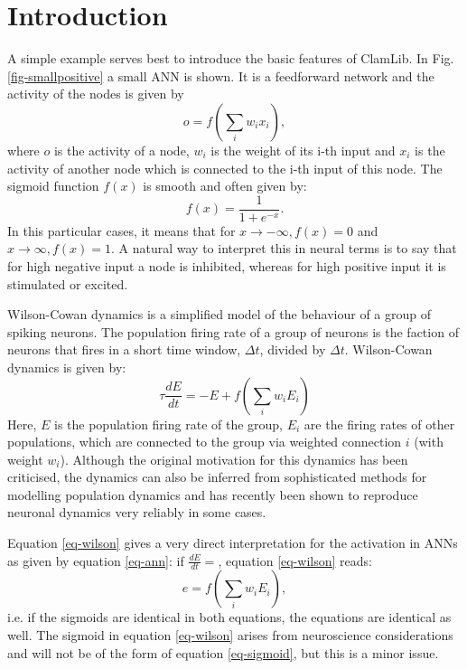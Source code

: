 \documentclass[11pt]{article}
\begin{document}
\section{Introduction}
A simple example serves best to introduce the basic features of ClamLib.
In Fig. \ref{fig-smallpositive} a small ANN is shown. It is a feedforward network and the activity of the nodes is given by
\begin{equation}
 o = f( \sum_i w_ix_i),
\label{eq-ann}
\end{equation}
where $o$ is the activity of a node, $w_i$ is the weight of its i-th input and $x_i$ is the activity of another node which is connected to the i-th input of this node.
The sigmoid function $f(x)$ is smooth and often given by:
\begin{equation}
f(x) = \frac{1}{1+ e^{-x}}.
\label{eq-sigmoid}
\end{equation} 
In this particular cases, it means that for $x \rightarrow -\infty, f(x) =0$ and $x \rightarrow \infty, f(x) =1$. A natural way to interpret this in neural terms is to say that for high negative input a node is inhibited, whereas for high positive input it is stimulated or excited.

Wilson-Cowan dynamics is a simplified model of the behaviour of a group of spiking neurons. The population firing rate of a group of neurons is the faction of neurons that fires in a short time window, $\Delta t$, divided by $\Delta t$. Wilson-Cowan dynamics is given by:
\begin{equation}
\tau \frac{ dE}{dt} = - E + f(\sum_i w_i E_i)
\label{eq-wilson}
\end{equation}
Here, $E$ is the population firing rate of the group, $E_i$ are the firing rates of other populations, which are connected to the group via weighted connection $i$ (with weight $w_i$). Although the original motivation for this dynamics has been criticised, the dynamics can also be inferred from sophisticated methods for modelling population dynamics and has recently been shown to reproduce neuronal dynamics very reliably in some cases.

Equation \ref{eq-wilson} gives a very direct interpretation for the activation in ANNs as given by equation \ref{eq-ann}: if $\frac{dE}{dt} = $, equation \ref{eq-wilson} reads:
\begin{equation}
e = f(\sum_i w_i E_i), 
\end{equation}
i.e. if the  sigmoids are identical in both equations, the equations are identical as well. The sigmoid in equation \ref{eq-wilson} arises from neuroscience considerations and will not be of the form of equation \ref{eq-sigmoid}, but this is a minor issue. 
\end{document}
